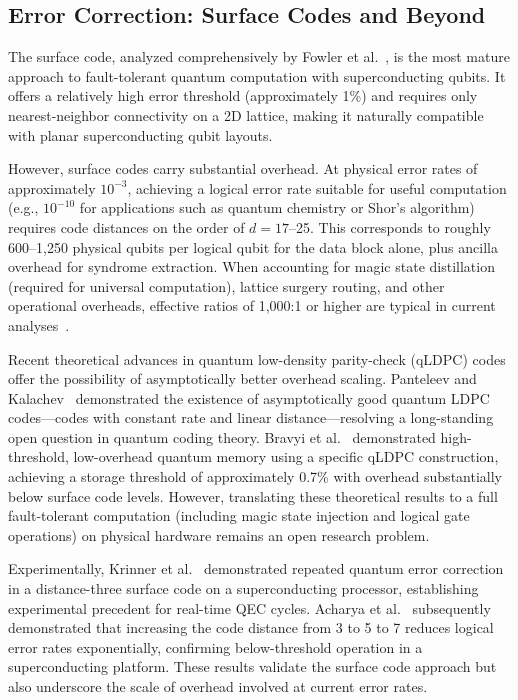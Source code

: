 \documentclass[conference]{IEEEtran}
\begin{document}
\subsection{Error Correction: Surface Codes and Beyond}

The surface code, analyzed comprehensively by Fowler et al.~\cite{fowler2012}, is the most mature approach to fault-tolerant quantum computation with superconducting qubits. It offers a relatively high error threshold (approximately 1\%) and requires only nearest-neighbor connectivity on a 2D lattice, making it naturally compatible with planar superconducting qubit layouts.

However, surface codes carry substantial overhead. At physical error rates of approximately $10^{-3}$, achieving a logical error rate suitable for useful computation (e.g., $10^{-10}$ for applications such as quantum chemistry or Shor's algorithm) requires code distances on the order of $d = 17$--25. This corresponds to roughly 600--1,250 physical qubits per logical qubit for the data block alone, plus ancilla overhead for syndrome extraction. When accounting for magic state distillation (required for universal computation), lattice surgery routing, and other operational overheads, effective ratios of 1,000:1 or higher are typical in current analyses~\cite{fowler2012, chamberland2022}.

Recent theoretical advances in quantum low-density parity-check (qLDPC) codes offer the possibility of asymptotically better overhead scaling. Panteleev and Kalachev~\cite{panteleev2022} demonstrated the existence of asymptotically good quantum LDPC codes---codes with constant rate and linear distance---resolving a long-standing open question in quantum coding theory. Bravyi et al.~\cite{bravyi2024} demonstrated high-threshold, low-overhead quantum memory using a specific qLDPC construction, achieving a storage threshold of approximately 0.7\% with overhead substantially below surface code levels. However, translating these theoretical results to a full fault-tolerant computation (including magic state injection and logical gate operations) on physical hardware remains an open research problem.

Experimentally, Krinner et al.~\cite{krinner2022} demonstrated repeated quantum error correction in a distance-three surface code on a superconducting processor, establishing experimental precedent for real-time QEC cycles. Acharya et al.~\cite{acharya2024} subsequently demonstrated that increasing the code distance from 3 to 5 to 7 reduces logical error rates exponentially, confirming below-threshold operation in a superconducting platform. These results validate the surface code approach but also underscore the scale of overhead involved at current error rates.
\end{document}
